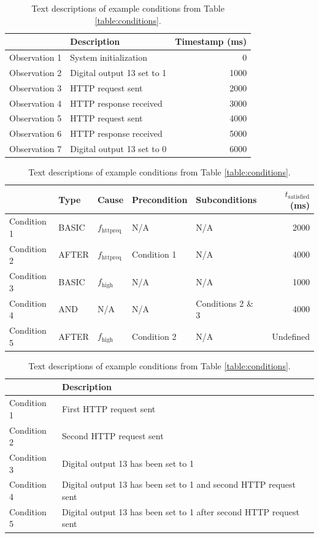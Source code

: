 \documentclass[12pt]{article}
\begin{document}
\begin{table}[ht]
\begin{center}
\caption{Example observations.}
\label{table:observations}
\begin{tabular}{l|lr}
& Description & Timestamp (ms) \\ \hline
Observation 1 & System initialization & 0 \\
Observation 2 & Digital output 13 set to 1 & 1000 \\
Observation 3 & HTTP request sent & 2000 \\
Observation 4 & HTTP response received & 3000 \\
Observation 5 & HTTP request sent & 4000 \\
Observation 6 & HTTP response received & 5000 \\
Observation 7 & Digital output 13 set to 0 & 6000 \\ \hline
\end{tabular}

\vspace{5mm}

\caption{Example conditions, with $t_{\text{satisfied}}$ calculated with respect to Table \ref{table:observations}.}
\label{table:conditions}

\begin{tabular}{l|llllr}
& Type & Cause & Precondition & Subconditions & $t_{\text{satisfied}}$ (ms) \\ \hline
Condition 1 & BASIC & $f_{\text{httpreq}}$ & N/A & N/A & 2000 \\
Condition 2 & AFTER & $f_{\text{httpreq}}$ & Condition 1 & N/A & 4000 \\
Condition 3 & BASIC & $f_{\text{high}}$ & N/A & N/A & 1000 \\
Condition 4 & AND & N/A & N/A & Conditions 2 \& 3 & 4000 \\
Condition 5 & AFTER & $f_{\text{high}}$ & Condition 2 & N/A & Undefined \\ \hline
\end{tabular}

\vspace{5mm}

\caption{Text descriptions of example conditions from Table \ref{table:conditions}.}
\label{table:condition-descs}

\begin{tabular}{l|l}
& Description \\ \hline
Condition 1 & First HTTP request sent \\
Condition 2 & Second HTTP request sent \\
Condition 3 & Digital output 13 has been set to 1 \\
Condition 4 & Digital output 13 has been set to 1 and second HTTP request sent \\
Condition 5 & Digital output 13 has been set to 1 after second HTTP request sent \\ \hline
\end{tabular}
\end{center}
\end{table}
\end{document}
